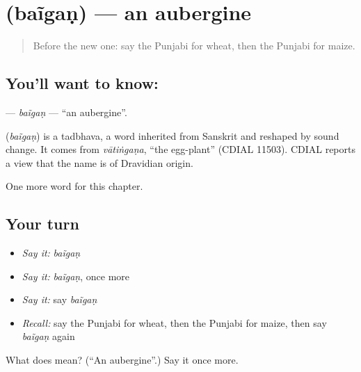 \section[\texorpdfstring{\pa{ਬੈਂਗਣ} (baĩgaṇ)}{ਬੈਂਗਣ (baĩgaṇ)}]{ (baĩgaṇ) — an aubergine}

\label{lesson:PA-C122-baigan}



\begin{quote}
Before the new one: say the Punjabi for wheat, then the Punjabi for maize.
\end{quote}

\subsection*{You'll want to know: }
\textbf{} — \emph{baĩgaṇ} — \textquotedblleft{}an aubergine\textquotedblright{}.

\begin{cousinweb}
\textbf{} (\emph{baĩgaṇ}) is a tadbhava, a word inherited from Sanskrit and reshaped by sound change. It comes from \emph{vātiṅgaṇa}, \textquotedblleft{}the egg-plant\textquotedblright{} (CDIAL 11503). CDIAL reports a view that the name is of Dravidian origin.
\end{cousinweb}

\begin{grammarlens}[title={What you've built}]
One more word for this chapter.
\end{grammarlens}

\subsection*{Your turn}
\begin{itemize}
\raggedright
  \item \emph{Say it:} \emph{baĩgaṇ}
  \item \emph{Say it:} \emph{baĩgaṇ}, once more
  \item \emph{Say it:} say \emph{baĩgaṇ}
  \item \emph{Recall:} say the Punjabi for wheat, then the Punjabi for maize, then say \emph{baĩgaṇ} again
\end{itemize}

\begin{tcolorbox}[breakable,colback=teal!4,colframe=teal!35!black,title={Before you move on}]
What does  mean? (\textquotedblleft{}An aubergine\textquotedblright{}.) Say it once more.
\end{tcolorbox}
